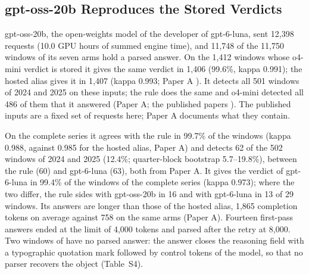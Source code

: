 \subsection{gpt-oss-20b Reproduces the Stored Verdicts}
\label{sec:results:oss}

gpt-oss-20b, the open-weights model of the developer of gpt-6-luna, sent 12{,}398 requests (10.0 GPU hours of summed engine time), and 11{,}748 of the 11{,}750 windows of its seven arms hold a parsed answer. On the 1{,}412 windows whose o4-mini verdict is stored it gives the same verdict in 1{,}406 (99.6\%, kappa 0.991); the hosted alias gives it in 1{,}407 (kappa 0.993; Paper A \cite{regan2026rerun}). It detects all 501 windows of 2024 and 2025 on these inputs; the rule does the same and o4-mini detected all 486 of them that it answered (Paper A; the published papers \cite{regan2026regimes}). The published inputs are a fixed set of requests here; Paper A documents what they contain.

On the complete series it agrees with the rule in 99.7\% of the windows (kappa 0.988, against 0.985 for the hosted alias, Paper A) and detects 62 of the 502 windows of 2024 and 2025 (12.4\%; quarter-block bootstrap 5.7--19.8\%), between the rule (60) and gpt-6-luna (63), both from Paper A. It gives the verdict of gpt-6-luna in 99.4\% of the windows of the complete series (kappa 0.973); where the two differ, the rule sides with gpt-oss-20b in 16 and with gpt-6-luna in 13 of 29 windows. Its answers are longer than those of the hosted alias, 1{,}865 completion tokens on average against 758 on the same arms (Paper A). Fourteen first-pass answers ended at the limit of 4{,}000 tokens and parsed after the retry at 8{,}000. Two windows of  have no parsed answer: the answer closes the reasoning field with a typographic quotation mark followed by control tokens of the model, so that no parser recovers the object (Table~S4).

